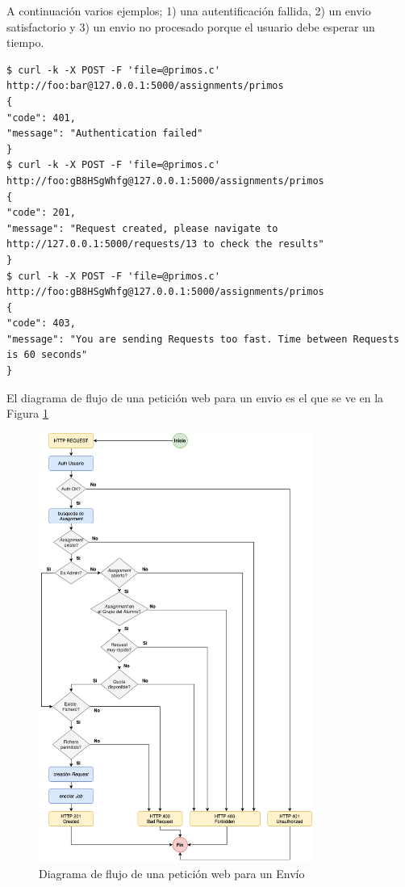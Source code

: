 \documentclass[11pt,spanish,listoffigures,listoftables]{tfgetsinf}
\begin{document}
A continuación varios ejemplos; 1) una autentificación fallida, 2) un \gls{envio} satisfactorio y 3) un \Gls{envio} no procesado porque el usuario debe esperar un tiempo.

\begin{lstlisting}[style=ascii-tree]
$ curl -k -X POST -F 'file=@primos.c' http://foo:bar@127.0.0.1:5000/assignments/primos
{
"code": 401,
"message": "Authentication failed"
}
$ curl -k -X POST -F 'file=@primos.c' http://foo:gB8HSgWhfg@127.0.0.1:5000/assignments/primos
{
"code": 201,
"message": "Request created, please navigate to http://127.0.0.1:5000/requests/13 to check the results"
}
$ curl -k -X POST -F 'file=@primos.c' http://foo:gB8HSgWhfg@127.0.0.1:5000/assignments/primos
{
"code": 403,
"message": "You are sending Requests too fast. Time between Requests is 60 seconds"
}
\end{lstlisting}

El diagrama de flujo de una petición web para un \gls{envio} es el que se ve en la Figura \ref{figura:request-flowchart}

\begin{figure}[!ht]
	\centering
	\includegraphics[width=0.8\textwidth]{img/request-flowchart}
	\caption[Diagrama de flujo de una petición web para un Envío]{Diagrama de flujo de una petición web para un Envío}
	\label{figura:request-flowchart}
\end{figure}
\end{document}
